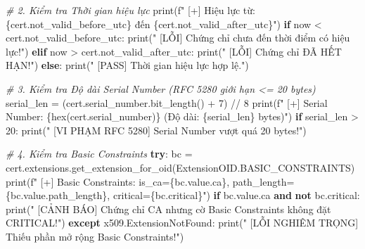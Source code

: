 \documentclass[
]{article}
\newenvironment{Shaded}{}{}
\newcommand{\BuiltInTok}[1]{\textcolor[rgb]{0.00,0.50,0.00}{#1}}
\newcommand{\CommentTok}[1]{\textcolor[rgb]{0.38,0.63,0.69}{\textit{#1}}}
\newcommand{\ControlFlowTok}[1]{\textcolor[rgb]{0.00,0.44,0.13}{\textbf{#1}}}
\newcommand{\DecValTok}[1]{\textcolor[rgb]{0.25,0.63,0.44}{#1}}
\newcommand{\KeywordTok}[1]{\textcolor[rgb]{0.00,0.44,0.13}{\textbf{#1}}}
\newcommand{\NormalTok}[1]{#1}
\newcommand{\OperatorTok}[1]{\textcolor[rgb]{0.40,0.40,0.40}{#1}}
\newcommand{\SpecialCharTok}[1]{\textcolor[rgb]{0.25,0.44,0.63}{#1}}
\newcommand{\SpecialStringTok}[1]{\textcolor[rgb]{0.73,0.40,0.53}{#1}}
\newcommand{\StringTok}[1]{\textcolor[rgb]{0.25,0.44,0.63}{#1}}
\begin{document}
\begin{Shaded}
\begin{Highlighting}[]
    \CommentTok{\# 2. Kiểm tra Thời gian hiệu lực}
    \BuiltInTok{print}\NormalTok{(}\SpecialStringTok{f" [+] Hiệu lực từ: }\SpecialCharTok{\{}\NormalTok{cert}\SpecialCharTok{.}\NormalTok{not\_valid\_before\_utc}\SpecialCharTok{\}}\SpecialStringTok{ đến }\SpecialCharTok{\{}\NormalTok{cert}\SpecialCharTok{.}\NormalTok{not\_valid\_after\_utc}\SpecialCharTok{\}}\SpecialStringTok{"}\NormalTok{)}
    \ControlFlowTok{if}\NormalTok{ now }\OperatorTok{\textless{}}\NormalTok{ cert.not\_valid\_before\_utc:}
        \BuiltInTok{print}\NormalTok{(}\StringTok{"  [LỖI] Chứng chỉ chưa đến thời điểm có hiệu lực!"}\NormalTok{)}
    \ControlFlowTok{elif}\NormalTok{ now }\OperatorTok{\textgreater{}}\NormalTok{ cert.not\_valid\_after\_utc:}
        \BuiltInTok{print}\NormalTok{(}\StringTok{"  [LỖI] Chứng chỉ ĐÃ HẾT HẠN!"}\NormalTok{)}
    \ControlFlowTok{else}\NormalTok{:}
        \BuiltInTok{print}\NormalTok{(}\StringTok{"  [PASS] Thời gian hiệu lực hợp lệ."}\NormalTok{)}

    \CommentTok{\# 3. Kiểm tra Độ dài Serial Number (RFC 5280 giới hạn \textless{}= 20 bytes)}
\NormalTok{    serial\_len }\OperatorTok{=}\NormalTok{ (cert.serial\_number.bit\_length() }\OperatorTok{+} \DecValTok{7}\NormalTok{) }\OperatorTok{//} \DecValTok{8}
    \BuiltInTok{print}\NormalTok{(}\SpecialStringTok{f" [+] Serial Number: }\SpecialCharTok{\{}\BuiltInTok{hex}\NormalTok{(cert.serial\_number)}\SpecialCharTok{\}}\SpecialStringTok{ (Độ dài: }\SpecialCharTok{\{}\NormalTok{serial\_len}\SpecialCharTok{\}}\SpecialStringTok{ bytes)"}\NormalTok{)}
    \ControlFlowTok{if}\NormalTok{ serial\_len }\OperatorTok{\textgreater{}} \DecValTok{20}\NormalTok{:}
        \BuiltInTok{print}\NormalTok{(}\StringTok{"  [VI PHẠM RFC 5280] Serial Number vượt quá 20 bytes!"}\NormalTok{)}

    \CommentTok{\# 4. Kiểm tra Basic Constraints}
    \ControlFlowTok{try}\NormalTok{:}
\NormalTok{        bc }\OperatorTok{=}\NormalTok{ cert.extensions.get\_extension\_for\_oid(ExtensionOID.BASIC\_CONSTRAINTS)}
        \BuiltInTok{print}\NormalTok{(}\SpecialStringTok{f" [+] Basic Constraints: is\_ca=}\SpecialCharTok{\{}\NormalTok{bc}\SpecialCharTok{.}\NormalTok{value}\SpecialCharTok{.}\NormalTok{ca}\SpecialCharTok{\}}\SpecialStringTok{, path\_length=}\SpecialCharTok{\{}\NormalTok{bc}\SpecialCharTok{.}\NormalTok{value}\SpecialCharTok{.}\NormalTok{path\_length}\SpecialCharTok{\}}\SpecialStringTok{, critical=}\SpecialCharTok{\{}\NormalTok{bc}\SpecialCharTok{.}\NormalTok{critical}\SpecialCharTok{\}}\SpecialStringTok{"}\NormalTok{)}
        \ControlFlowTok{if}\NormalTok{ bc.value.ca }\KeywordTok{and} \KeywordTok{not}\NormalTok{ bc.critical:}
            \BuiltInTok{print}\NormalTok{(}\StringTok{"  [CẢNH BÁO] Chứng chỉ CA nhưng cờ Basic Constraints không đặt CRITICAL!"}\NormalTok{)}
    \ControlFlowTok{except}\NormalTok{ x509.ExtensionNotFound:}
        \BuiltInTok{print}\NormalTok{(}\StringTok{"  [LỖI NGHIÊM TRỌNG] Thiếu phần mở rộng Basic Constraints!"}\NormalTok{)}


\end{Highlighting}
\end{Shaded}
\end{document}
